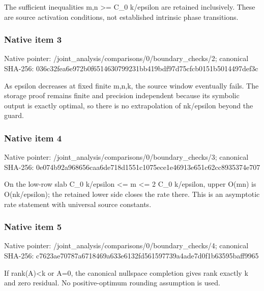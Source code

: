 \documentclass[10pt,a4paper]{article}
\begin{document}
\begingroup\raggedright\sloppy The sufficient inequalities m,\allowbreak{}n >=\allowbreak{} C\_\allowbreak{}0 k/\allowbreak{}epsilon are retained inclusively. These are source activation conditions,\allowbreak{} not established intrinsic phase transitions.\par\endgroup

\subsubsection{Native item 3}
Native pointer: /joint\_\allowbreak{}analysis/comparisons/0/boundary\_\allowbreak{}checks/2; canonical SHA-256: 036c32fea6e972b0f6514630799231bb419bdf97d75cfcb0151b5014497def3c

\begingroup\raggedright\sloppy As epsilon decreases at fixed finite m,\allowbreak{}n,\allowbreak{}k,\allowbreak{} the source window eventually fails. The storage proof remains finite and precision independent because its symbolic output is exactly optimal,\allowbreak{} so there is no extrapolation of nk/\allowbreak{}epsilon beyond the guard.\par\endgroup

\subsubsection{Native item 4}
Native pointer: /joint\_\allowbreak{}analysis/comparisons/0/boundary\_\allowbreak{}checks/3; canonical SHA-256: 0e074b92a968656caa6de718d1551c1075ece1e46913e651c62cc8935374e707

\begingroup\raggedright\sloppy On the low-row slab C\_\allowbreak{}0 k/\allowbreak{}epsilon <=\allowbreak{} m <=\allowbreak{} 2 C\_\allowbreak{}0 k/\allowbreak{}epsilon,\allowbreak{} upper O(mn) is O(nk/\allowbreak{}epsilon);\allowbreak{} the retained lower side closes the rate there. This is an asymptotic rate statement with universal source constants.\par\endgroup

\subsubsection{Native item 5}
Native pointer: /joint\_\allowbreak{}analysis/comparisons/0/boundary\_\allowbreak{}checks/4; canonical SHA-256: c7623ae70787a6718469a633e6132fd561597739a4ade7d0f1b63595baff9965

\begingroup\raggedright\sloppy If rank(A)<k or A=\allowbreak{}0,\allowbreak{} the canonical nullspace completion gives rank exactly k and zero residual. No positive-optimum rounding assumption is used.\par\endgroup
\end{document}
